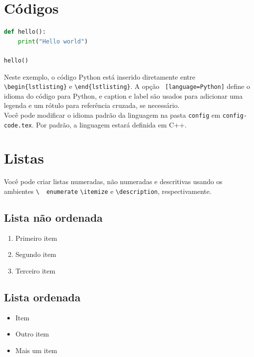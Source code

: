 \documentclass[11pt,letterpaper]{article}
\begin{document}
\section{Códigos}



\begin{lstlisting}[language=Python, caption={Exemplo em Python}, label={lst:exemplo}]
def hello():
    print("Hello world")
    
hello()
\end{lstlisting}

Neste exemplo, o código Python está inserido diretamente entre \verb|\begin{lstlisting}|  e \verb|\end{lstlisting}|. A opção \verb| [language=Python]| define o idioma do código para Python, e caption e label são usados para adicionar uma legenda e um rótulo para referência cruzada, se necessário.\\ 
Você pode modificar o idioma padrão da linguagem na pasta \verb|config| em \verb|config-code.tex|. Por padrão, a linguagem estará definida em C++.

\section{Listas}
Você pode criar listas numeradas, não numeradas e descritivas usando os ambientes \verb|\  enumerate| \verb|\itemize| e \verb|\description|, respectivamente.

\subsection{Lista não ordenada}
\begin{enumerate}
    \item Primeiro item
    \item Segundo item
    \item Terceiro item
\end{enumerate}

\subsection{Lista ordenada}
\begin{itemize}
    \item Item
    \item Outro item
    \item Mais um item
\end{itemize}
\end{document}
